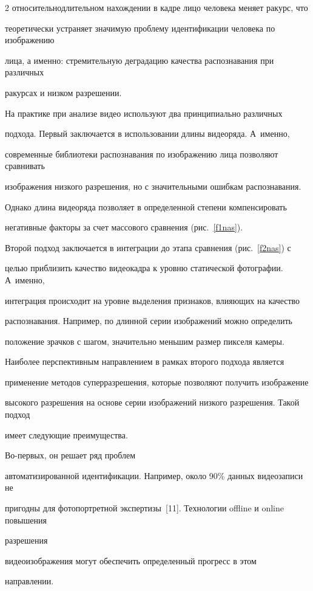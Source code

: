 \begin{multicols}{2}
относительно\linebreak длительном нахождении в кадре лицо человека меняет ракурс, что


теоретически устраняет значимую проблему идентификации человека по изображению


лица, а именно: стремительную деградацию качества распознавания при различных


ракурсах и низком разрешении.





     На практике при анализе видео используют два принципиально различных


подхода. Первый заключается в использовании длины видеоряда. А~именно,


современные библиотеки распознавания по изоб\-ра\-же\-нию лица позволяют сравнивать


изображения низкого разрешения, но с значительными ошибкам распознавания.


Однако длина видеоряда позволяет в определенной степени компенсировать


негативные факторы за счет массового сравнения (рис.~\ref{f1nas}).








      Второй подход заключается в интеграции до этапа сравнения (рис.~\ref{f2nas}) с


целью приблизить качество видеокадра к уровню статической фотографии. А~именно,


интеграция происходит на уровне выделения признаков, влияющих на качество


распознавания. Например, по длинной серии изоб\-ра\-же\-ний можно определить


положение зрачков с шагом, значительно меньшим размер пикселя камеры.








Наиболее перспективным направлением в рамках второго подхода является


применение методов суперразрешения, которые позволяют получить изображение


высокого разрешения на основе серии  изображений низкого разрешения. Такой подход


имеет следующие преимущества. 





Во-первых, он решает ряд проблем


автоматизированной идентификации. Например, около 90\% данных видеозаписи не


пригодны для фотопортретной экспертизы~[11]. Технологии offline и online повышения


разрешения


 видеоизображения могут обеспечить определенный прогресс в этом


на\-прав\-ле\-нии. 





\end{multicols}
